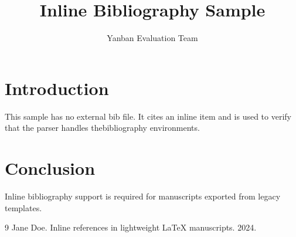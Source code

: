 \documentclass{article}
\title{Inline Bibliography Sample}
\author{Yanban Evaluation Team}
\begin{document}
\maketitle

\section{Introduction}
This sample has no external bib file. It cites an inline item\cite{doe2024inline} and is used to verify that the parser handles thebibliography environments.

\section{Conclusion}
Inline bibliography support is required for manuscripts exported from legacy templates.

\begin{thebibliography}{9}
 Jane Doe. Inline references in lightweight LaTeX manuscripts. 2024.
\end{thebibliography}
\end{document}
